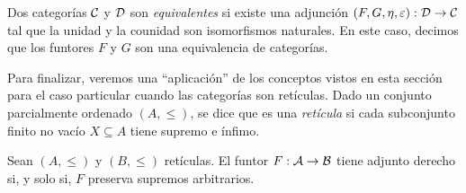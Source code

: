     \begin{definition}
        Dos categorías ${\mathcal C}$ y ${\mathcal D}$ son \emph{equivalentes} si existe una adjunción $(F,G, \eta,\varepsilon):{\mathcal D}\to{\mathcal C}$ tal que la unidad y la counidad son isomorfismos naturales. En este caso, decimos que los funtores $F$ y $G$ son una equivalencia de categorías. 
    \end{definition}
    Para finalizar, veremos una ``aplicación'' de los conceptos vistos en esta sección para el caso particular cuando las categorías son retículas. Dado un conjunto parcialmente ordenado $(A,\leq)$, se dice que es una \emph{retícula} si cada subconjunto finito no vacío $X\subseteq A$ tiene supremo e ínfimo.
    \begin{lema}
    Sean $(A,\leq)$ y $(B,\leq)$ retículas. El funtor $F:{\mathcal A}\to{\mathcal B}$ tiene adjunto derecho si, y solo si, $F$ preserva supremos arbitrarios.     
    \end{lema}
